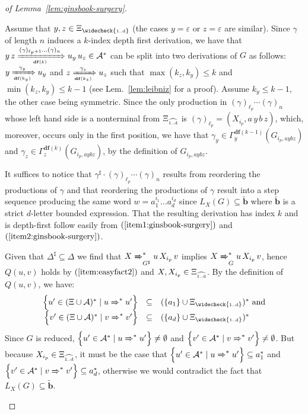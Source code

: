 \documentclass[final]{llncs}
\def\set#1{{\left\{ #1 \right\}}}
\def\prod{\Delta}
\def\patt{{\widetilde{\mathbf{b}}}}
\def\df#1{\scriptscriptstyle\mathbf{df}(#1)}
\def\Vars{\ensuremath{\Xi}}
\def\Varsi{\ensuremath{\Xi_{\widecheck{\text{\tiny 1..d}}}}}
\def\Varse{\ensuremath{\Xi_{\widehat{\text{\tiny 1..d}}}}}
\begin{document}
\begin{proof}[of Lemma~\ref{lem:ginsbook-surgery}]
\begin{compactenum}[1.]
  \item Assume that $y,z \in \Varsi$ (the cases $y = \varepsilon$ or $z = \varepsilon$
    are similar).  Since \(\gamma\) of length \(n\) induces a
    $k$-index depth first derivation, we have that
		$y\, z \xRightarrow[\df{k}]{(\gamma)_{\ell_{p}+1} \ldots (\gamma)_n} u_y\, u_z \in \mathcal{A}^*$ can be split
		into two derivations of \(G\) as follows: $y \xRightarrow[\df{k_y}]{\gamma_{y}} u_y$ and $z \xRightarrow[\df{k_z}]{\gamma_{z}} u_z$ such that
		\(\max(k_z,k_y)\leq k\) and \(\min(k_z,k_y)\leq k-1 \) (see Lem.~\ref{lem:leibniz} for a proof).
		Assume \(k_y \leq k-1\), the other case being symmetric.
		Since the only production in
		$(\gamma)_{\ell_{p}}\cdots (\gamma)_n$ whose left hand
    side is a nonterminal from $\Varse$ is $ (\gamma)_{\ell_p} =(X_{i_p},
    a\, y\, b\, z)$, which, moreover, occurs only in the first position, we have
		that $\gamma_y \in \Gamma_y^{\df{k-1}}(G_{i_p,aybz})$ and $\gamma_z \in
    \Gamma_z^{\df{k}}(G_{i_p,aybz})$, by the definition of $G_{i_p,aybz}$.

	\item It suffices to notice that \(\gamma^\sharp\cdot (\gamma)_{\ell_p}\cdots (\gamma)_n\) results from reordering the productions of \(\gamma\)
    and that reordering the productions of \(\gamma\) result into a step sequence producing the same word \(w = a_1^{i_1}\ldots
    a_d^{i_d}\) since \(L_X(G)\subseteq \patt\) where \(\patt\) is a strict \(d\)-letter bounded expression.
		That the resulting derivation has index \(k\) and is depth-first follow easily from \((\ref{item1:ginsbook-surgery})\) and  \((\ref{item2:ginsbook-surgery})\).

  \item Given that \(\prod^\sharp \subseteq \prod\) we find that \( X
    \xRightarrow{}^*_{G^\sharp} u\, X_{i_p}\, v \) implies \( X
    \xRightarrow{}^*_{G} u\, X_{i_p}\, v \), hence \( Q(u,v) \) holds by
    \( (\ref{item:easyfact2}) \) and \( X, X_{i_p} \in \Varse \). By the
    definition of \( Q(u,v) \), we have: 
    \[\begin{array}{rcl}
    \set{u' \in (\Vars \cup \mathcal{A})^* \mid u\xRightarrow{}^* u' } & \subseteq & ( \set{a_1}
    \cup \Varsi)^* ~\mbox{and} \\ 
    \set{v' \in (\Vars\cup\mathcal{A})^* \mid v \xRightarrow{}^* v' } & \subseteq & 
    ( \set{a_d} \cup \Varsi)^*
    \end{array}\] 
    Since \(G\) is reduced, $\set{u' \in \mathcal{A}^*
      \mid u \xRightarrow{}^* u' } \neq \emptyset$ and $\set{v' \in
      \mathcal{A}^* \mid v \xRightarrow{}^* v' } \neq \emptyset$.  But
    because $X_{i_p} \in \Varse$, it must be the case that $\set{u' \in
      \mathcal{A}^* \mid u \xRightarrow{}^* u' } \subseteq a_1^*$ and
    $\set{v' \in \mathcal{A}^* \mid v \xRightarrow{}^* v' } \subseteq
    a_d^*$, otherwise we would contradict the fact that
    \(L_{X}(G)\subseteq\patt\).


\end{compactenum}
\end{proof}
\end{document}
